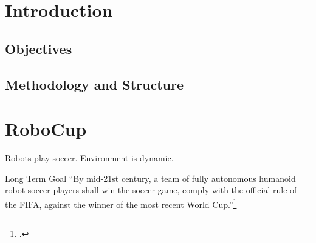 \newpage

\listoftables
{}
\newpage


\listoflistings
{}
\newpage

\renewcommand{\thepage}{\arabic{page}}

\setcounter{page}{1} 


\section{Introduction}
\label{sec:introduction}




\subsection{Objectives}
\label{sec:objectives}



\subsection{Methodology and Structure}
\label{sec:methodology}



\newpage
\section{RoboCup \label{sec:robo}}
Robots play soccer.
Environment is dynamic.

Long Term Goal “By mid-21st century, a team of fully autonomous humanoid robot
soccer players shall win the soccer game, comply with the official rule of the
FIFA, against the winner of the most recent World
Cup.”\footcite[Cf.][]{robo_objectives}

